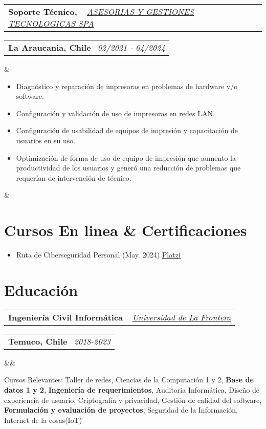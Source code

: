 \documentclass[11pt,a4paper,sans]{moderncv}
\makeatletter
\newcommand*{\customcventry}[7][.13em]{
    \begin{tabular}{@{}l}
    {\bfseries #4} \
    {\itshape #3}
    \end{tabular}
    \hfill
    \begin{tabular}{l@{}}
    {\bfseries #5} \
    {\itshape #2}
    \end{tabular}
    \ifx&#7&%
    \else{\
    \begin{minipage}{\maincolumnwidth}%
    \small#7%
    \end{minipage}}\fi%
    \par\addvspace{#1}
}
\makeatother
\begin{document}
\customcventry
    {02/2021 ‐ 04/2024}
    {{ \href{http://www.tisol.cl/}{\underline{ASESORIAS Y GESTIONES TECNOLOGICAS SPA}} }}
    {Soporte Técnico,}
    {La Araucania, Chile}
    {}
    {{\begin{itemize}[leftmargin=0.6cm, label={\textbullet}]
        \item Diagnóstico y reparación de impresoras en problemas de hardware y/o software.
        \item Configuración y validación de uso de impresoras en redes LAN.
        \item Configuración de usabilidad de equipos de impresión y capacitación de usuarios en su uso.
        \item Optimización de forma de uso de equipo de impresión que aumento la productividad de los usuarios y generó una reducción de problemas que requerían de intervención de técnico.
    \end{itemize}
    }
}

\section{Cursos En linea \& Certificaciones}
    \begin{itemize}[label=\textbullet]
        \item Ruta de Ciberseguridad Personal (May. 2024) \underline{\href{https://1drv.ms/b/c/13c8ae619d64655e/EZYaMe6SBhJAshtvq4ORCQoBwWMYRerI4_xiuqXjORVd0w?e=I4tLqg}{{Platzi}}}
    \end{itemize}


\section{Educación}
\customcventry
    {2018-2023}
    { \href{https://1drv.ms/b/c/13c8ae619d64655e/EV5lZJ1hrsgggBOHLAAAAAABHh9OZUbWLd2nx7PTa_OSsg?e=Fedmge}
        {\underline{Universidad de La Frontera}} }
        {Ingeniería Civil Informática}
        {Temuco, Chile}
    {}{}
    {Cursos Relevantes: 
        Taller de redes, 
        Ciencias de la Computación 1 y 2, 
        \textbf{Base de datos 1 y 2}, 
        \textbf{Ingeniería de requerimientos},
        Auditoria Informática, 
        Diseño de experiencia de usuario, 
        Criptografía y privacidad, 
        Gestión de calidad del software, 
        \textbf{Formulación y evaluación de proyectos},
        Seguridad de la Información,
        Internet de la cosas(IoT)
}
    
\end{document}
